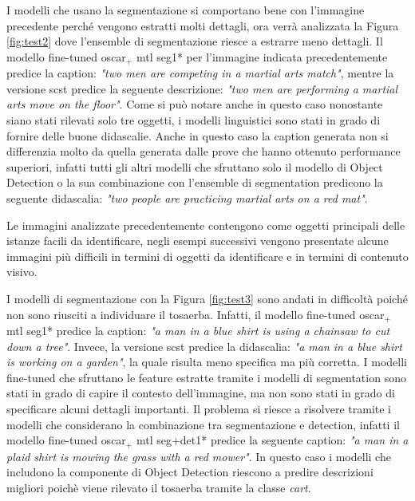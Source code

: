 I modelli che usano la segmentazione si comportano bene con l'immagine precedente perché vengono estratti molti dettagli, ora verrà analizzata la Figura \ref{fig:test2} dove l'ensemble di segmentazione riesce a estrarre meno dettagli. Il modello fine-tuned \acrshort{oscar}$_+$ \acrshort{mtl} seg1* per l'immagine indicata precedentemente predice la caption: \textit{"two men are competing in a martial arts match"}, mentre la versione \acrshort{scst} predice la seguente descrizione: \textit{"two men are performing a martial arts move on the floor"}. Come si può notare anche in questo caso nonostante siano stati rilevati solo tre oggetti, i modelli linguistici sono stati in grado di fornire delle buone didascalie. Anche in questo caso la caption generata non si differenzia molto da quella generata dalle prove che hanno ottenuto performance superiori, infatti tutti gli altri modelli che sfruttano solo il modello di Object Detection o la sua combinazione con l'ensemble di segmentation predicono la seguente didascalia: \textit{"two people are practicing martial arts on a red mat"}.


Le immagini analizzate precedentemente contengono come oggetti principali delle istanze facili da identificare, negli esempi successivi vengono presentate alcune immagini più difficili in termini di oggetti da identificare e in termini di contenuto visivo.


I modelli di segmentazione con la Figura \ref{fig:test3} sono andati in difficoltà poiché non sono riusciti a individuare il tosaerba. Infatti, il modello fine-tuned \acrshort{oscar}$_+$ \acrshort{mtl} seg1* predice la caption: \textit{"a man in a blue shirt is using a chainsaw to cut down a tree"}. Invece, la versione \acrshort{scst} predice la didascalia: \textit{"a man in a blue shirt is working on a garden"}, la quale risulta meno specifica ma più corretta. I modelli fine-tuned che sfruttano le feature estratte tramite i modelli di segmentation sono stati in grado di capire il contesto dell'immagine, ma non sono stati in grado di specificare alcuni dettagli importanti. Il problema si riesce a risolvere tramite i modelli che considerano la combinazione tra segmentazione e detection, infatti il modello fine-tuned \acrshort{oscar}$_+$ \acrshort{mtl} seg+det1* predice la seguente caption: \textit{"a man in a plaid shirt is mowing the grass with a red mower"}. In questo caso i modelli che includono la componente di Object Detection riescono a predire descrizioni migliori poichè viene rilevato il tosaerba tramite la classe \textit{cart}.


